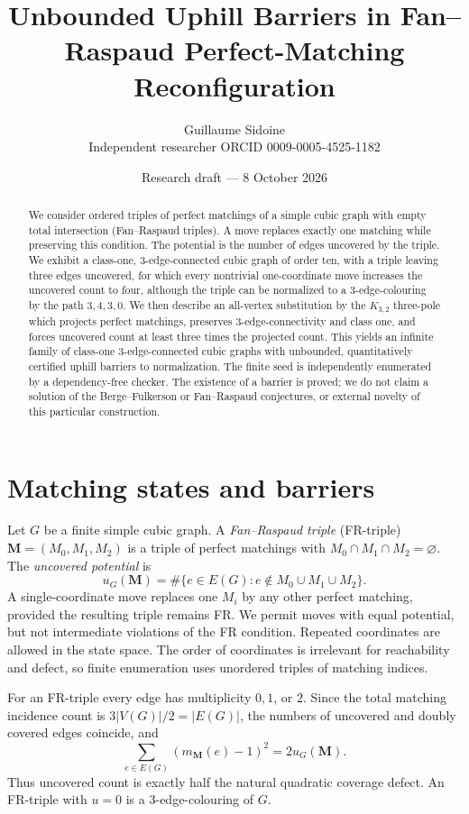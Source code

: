 \documentclass[11pt]{article}
\title{Unbounded Uphill Barriers in Fan--Raspaud Perfect-Matching Reconfiguration}
\author{Guillaume Sidoine\\\small Independent researcher \quad ORCID 0009-0005-4525-1182}
\date{Research draft --- 8 October 2026}
\begin{document}
\maketitle
\begin{abstract}
We consider ordered triples of perfect matchings of a simple cubic graph with empty total intersection (Fan--Raspaud triples). A move replaces exactly one matching while preserving this condition. The potential is the number of edges uncovered by the triple. We exhibit a class-one, $3$-edge-connected cubic graph of order ten, with a triple leaving three edges uncovered, for which every nontrivial one-coordinate move increases the uncovered count to four, although the triple can be normalized to a $3$-edge-colouring by the path $3,4,3,0$. We then describe an all-vertex substitution by the $K_{3,2}$ three-pole which projects perfect matchings, preserves $3$-edge-connectivity and class one, and forces uncovered count at least three times the projected count. This yields an infinite family of class-one $3$-edge-connected cubic graphs with unbounded, quantitatively certified uphill barriers to normalization. The finite seed is independently enumerated by a dependency-free checker. The existence of a barrier is proved; we do not claim a solution of the Berge--Fulkerson or Fan--Raspaud conjectures, or external novelty of this particular construction.
\end{abstract}

\section{Matching states and barriers}
Let $G$ be a finite simple cubic graph. A \emph{Fan--Raspaud triple} (FR-triple) $\mathbf M=(M_0,M_1,M_2)$ is a triple of perfect matchings with $M_0\cap M_1\cap M_2=\varnothing$. The \emph{uncovered potential} is
\[
  u_G(\mathbf M)=\#\{e\in E(G):e\notin M_0\cup M_1\cup M_2\}.
\]
A single-coordinate move replaces one $M_i$ by any other perfect matching, provided the resulting triple remains FR. We permit moves with equal potential, but not intermediate violations of the FR condition. Repeated coordinates are allowed in the state space. The order of coordinates is irrelevant for reachability and defect, so finite enumeration uses unordered triples of matching indices.

For an FR-triple every edge has multiplicity $0,1$, or $2$. Since the total matching incidence count is $3|V(G)|/2=|E(G)|$, the numbers of uncovered and doubly covered edges coincide, and
\[
  \sum_{e\in E(G)}(m_{\mathbf M}(e)-1)^2=2u_G(\mathbf M). \tag{1}
\]
Thus uncovered count is exactly half the natural quadratic coverage defect. An FR-triple with $u=0$ is a $3$-edge-colouring of $G$.
\end{document}
